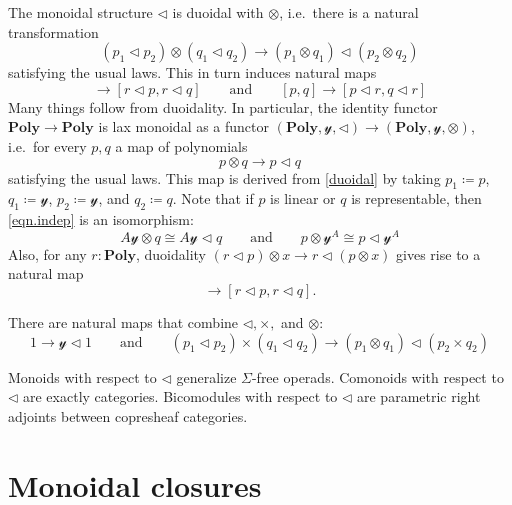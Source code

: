 \documentclass[11pt, one side, article]{memoir}
\theoremstyle{definition}
\theoremstyle{plain}
\newcommand{\Cat}[1]{\mathbf{#1}}%
\newcommand{\too}{\longrightarrow}
\newcommand{\yon}{\mathcal{y}}
\newcommand{\poly}{\Cat{Poly}}
\newcommand{\0}{\textsf{0}}
\newcommand{\1}{\tn{\textsf{1}}}
\newcommand{\tri}{\mathbin{\triangleleft}}
\newcommand{\qqand}{\qquad\text{and}\qquad}
\begin{document}
The monoidal structure $\tri$ is duoidal with $\otimes$, i.e.\ there is a natural transformation
\begin{equation}\label{duoidal}
	(p_1\tri p_2)\otimes(q_1\tri q_2)\too(p_1\otimes q_1)\tri(p_2\otimes q_2)
\end{equation}
satisfying the usual laws. This in turn induces natural maps
\begin{equation}
	[p,q]\to[r\tri p, r\tri q]
	\qqand
	[p,q]\to[p\tri r, q\tri r]
\end{equation}
Many things follow from duoidality. In particular, the identity functor $\poly\to\poly$ is lax monoidal as a functor $(\poly,\yon,\tri)\to(\poly,\yon,\otimes)$, i.e.\ for every $p,q$ a map of polynomials
\begin{equation}\label{eqn.indep}
	p\otimes q\to p\tri q
\end{equation}
satisfying the usual laws. This map is derived from \eqref{duoidal} by taking $p_1\coloneqq p$, $q_1\coloneqq\yon$, $p_2\coloneqq\yon$, and $q_2\coloneqq q$. Note that if $p$ is linear or $q$ is representable, then \eqref{eqn.indep} is an isomorphism:
\begin{equation}
  A\yon\otimes q\cong A\yon\tri q
  \qqand
  p\otimes\yon^A\cong p\tri \yon^A
\end{equation}
Also, for any $r:\poly$, duoidality $(r\tri p)\otimes x\to r\tri(p\otimes x)$ gives rise to a natural map
\begin{equation}
	[p,q]\to[r\tri p, r\tri q].
\end{equation}

There are natural maps that combine $\tri, \times,$ and $\otimes$:
\begin{equation}
	1\to\yon\tri 1
	\qqand
	(p_1\tri p_2)\times(q_1\tri q_2)\to (p_1\otimes q_1)\tri (p_2\times q_2)
\end{equation}

Monoids with respect to $\tri$ generalize $\Sigma$-free operads. Comonoids with respect to $\tri$ are exactly categories. Bicomodules with respect to $\tri$ are parametric right adjoints between copresheaf categories.

\chapter{Monoidal closures}
\end{document}
